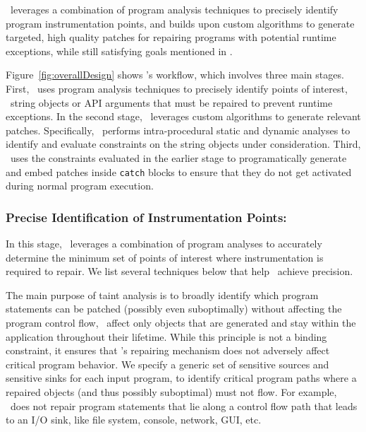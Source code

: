  \tool\ leverages a combination of program 
analysis techniques to precisely identify program instrumentation points, and
builds upon custom algorithms to generate targeted, high quality patches for
repairing programs with potential runtime exceptions, while still satisfying
goals mentioned in .

Figure~\ref{fig:overallDesign} shows \tool's workflow, which involves three
main stages. First, \tool\ uses program analysis techniques to precisely
identify points of interest, \ie\ string objects or API arguments that must be
repaired to prevent runtime exceptions. In the second stage, \tool\ leverages
custom algorithms to generate relevant patches. Specifically, \tool\ performs
intra-procedural static and dynamic analyses to identify and evaluate
constraints on the string objects under consideration. Third, \tool\ uses the
constraints evaluated in the earlier stage to programatically generate and embed
patches inside \texttt{catch} blocks to ensure that they do not get activated
during normal program execution.

\subsubsection{Precise Identification of Instrumentation Points: }
\label{sec:tool:stage1}

In this stage, \tool\ leverages a combination of program analyses to accurately
determine the minimum set of points of interest where instrumentation is
required to repair. We list several techniques below that help \tool\ achieve
precision.

 The main purpose of taint analysis is to
broadly identify which program statements can be patched (possibly even
suboptimally) without affecting the program control flow, \ie\ affect only
objects that are generated and stay within the application throughout their
lifetime. While this principle is not a binding constraint, it ensures that
\tool's repairing mechanism does not adversely affect critical program behavior.
We specify a generic set of sensitive sources and sensitive sinks for each input
program, to identify critical program paths where a repaired 
objects (and thus possibly suboptimal) must not flow. For example, \tool\ does
not repair program statements that lie along a control flow path that leads to
an I/O sink, like file system, console, network, GUI, etc.

